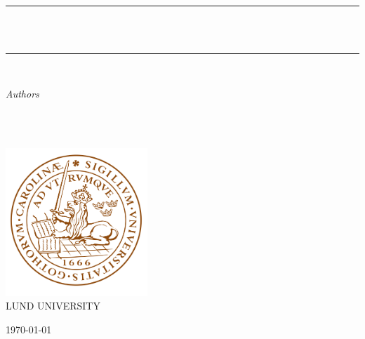 \begin{titlepage}  

	\newcommand{\HRule}{\rule{\linewidth}{0.5mm}}
	
 \centering 	
 
	\textsc{\LARGE \Course}\\[2cm] 
 
	\HRule\\[1.0cm]
 
	{\huge\bfseries \Title }\\[0.4cm] 
 
	\HRule\\[1.5cm]
 
	\begin{minipage}[t]{0.5\textwidth}
	\begin{center}
 
		\large
   
		\textit{Authors}\\
   
		\AuthorOne \\
        \AuthorTwo
            
        \href{mailto:\EmailOne}{\texttt{\EmailOne}} \\
            
        \href{mailto:\EmailTwo}{\texttt{\EmailTwo}}
            
        \vspace{5mm}
                
        \SupervisorInfo
                
	\end{center}
	\end{minipage}

	\vfill\vfill\vfill\vfill
 
   \includegraphics[width=0.4\textwidth]{Figures/Lund logo.png}
    \\ \textsc{\LARGE {LUND UNIVERSITY}}
    
	\vfill\vfill\vfill 
 
    \today
        
	\vfill 
 
\end{titlepage}
